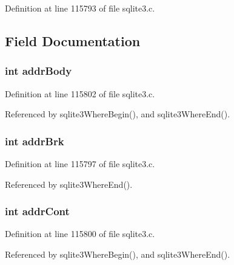 Definition at line 115793 of file sqlite3.\+c.



\subsection{Field Documentation}
\hypertarget{struct_where_level_aafb1eec74f5f867b898e92324f78d46f}{}
\subsubsection[{addr\+Body}]{\setlength{\rightskip}{0pt plus 5cm}int addr\+Body}\label{struct_where_level_aafb1eec74f5f867b898e92324f78d46f}


Definition at line 115802 of file sqlite3.\+c.



Referenced by sqlite3\+Where\+Begin(), and sqlite3\+Where\+End().

\hypertarget{struct_where_level_ad1b2cf3d5417f400ef25e11d7e75668c}{}
\subsubsection[{addr\+Brk}]{\setlength{\rightskip}{0pt plus 5cm}int addr\+Brk}\label{struct_where_level_ad1b2cf3d5417f400ef25e11d7e75668c}


Definition at line 115797 of file sqlite3.\+c.



Referenced by sqlite3\+Where\+End().

\hypertarget{struct_where_level_a7d833ccdc1fa083eeb29104ce6f31f41}{}
\subsubsection[{addr\+Cont}]{\setlength{\rightskip}{0pt plus 5cm}int addr\+Cont}\label{struct_where_level_a7d833ccdc1fa083eeb29104ce6f31f41}


Definition at line 115800 of file sqlite3.\+c.



Referenced by sqlite3\+Where\+Begin(), and sqlite3\+Where\+End().

\hypertarget{struct_where_level_ab50af87e2ba502a5a49807b2eaee976e}{}
